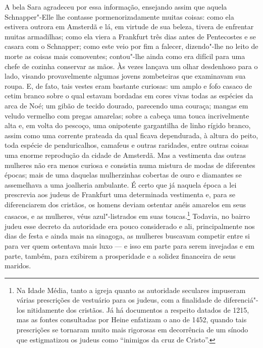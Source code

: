 A bela Sara agradeceu por essa informação, ensejando assim que aquela
Schnapper"-Elle lhe contasse pormenorizadamente muitas coisas: como
ela estivera outrora em Amsterdã e lá, em virtude de sua beleza, tivera
de enfrentar muitas armadilhas; como ela viera a Frankfurt três dias
antes de Pentecostes e se casara com o Schnapper; como este veio por
fim a falecer, dizendo"-lhe no leito de morte as coisas mais
comoventes; contou"-lhe ainda como era difícil para uma chefe de
cozinha conservar as mãos. Às vezes lançava um olhar desdenhoso para o
lado, visando provavelmente algumas jovens zombeteiras que examinavam
sua roupa. E, de fato, tais vestes eram bastante curiosas: um amplo e
fofo casaco de cetim branco sobre o qual estavam bordadas em cores
vivas todas as espécies da arca de Noé; um gibão de tecido dourado,
parecendo uma couraça; mangas em veludo vermelho com pregas amarelas;
sobre a cabeça uma touca incrivelmente alta e, em volta do pescoço, uma
onipotente gargantilha de linho rígido branco, assim como uma corrente
prateada da qual ficava dependurada, à altura do peito, toda espécie de
penduricalhos, camafeus e outras raridades, entre outras coisas uma
enorme reprodução da cidade de Amsterdã. Mas a vestimenta das outras
mulheres não era menos curiosa e consistia numa mistura de modas de
diferentes épocas; mais de uma daquelas mulherzinhas cobertas de ouro e
diamantes se assemelhava a uma joalheria ambulante. É certo que já
naquela época a lei prescrevia aos judeus de Frankfurt uma determinada
vestimenta e, para se diferenciarem dos cristãos, os homens deviam
ostentar anéis amarelos em seus casacos, e as mulheres, véus
azul"-listrados em suas
toucas.\footnote{ Na Idade
Média, tanto a igreja quanto as autoridade seculares impuseram várias
prescrições de vestuário para os judeus, com a finalidade de
diferenciá"-los nitidamente dos cristãos. Já há documentos a respeito
datados de 1215, mas as fontes consultadas por Heine enfatizam o ano de
1452, quando tais prescrições se tornaram muito mais rigorosas em
decorrência de um sínodo que estigmatizou os judeus como ``inimigos da
cruz de Cristo''.}
 Todavia, no bairro judeu esse decreto da autoridade era pouco
considerado e ali, principalmente nos dias de festa e ainda mais na
sinagoga, as mulheres buscavam competir entre si para ver quem
ostentava mais luxo --- e isso em parte para serem invejadas e em parte,
também, para exibirem a prosperidade e a solidez financeira de seus
maridos.

